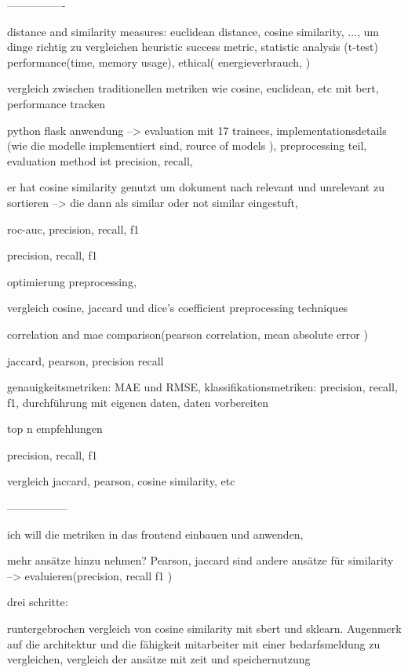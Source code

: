\documentclass[a4paper,12pt]{scrreprt}
\begin{document}
----------------


\cite{andersson2022comparison}
distance and similarity measures: euclidean distance, cosine similarity, ...,
um dinge richtig zu vergleichen heuristic success metric, statistic analysis (t-test) performance(time, memory usage), ethical( energieverbrauch, )

vergleich zwischen traditionellen metriken wie cosine, euclidean, etc mit bert, performance tracken

\cite{navrozidis2020using}

python flask anwendung --> evaluation mit 17 trainees, implementationsdetails (wie die modelle implementiert sind, rource of models ), preprocessing teil, evaluation method ist precision, recall,

er hat cosine similarity genutzt um dokument nach relevant und unrelevant zu sortieren --> die dann als similar oder not similar eingestuft,



\cite{lavi2021consultantbert}
roc-auc, precision, recall, f1

\cite{jamshidian2023evaluation}
precision, recall, f1

optimierung preprocessing,

\cite{henderi2021text}
vergleich cosine, jaccard und dice's coefficient
preprocessing techniques

correlation and mae comparison(pearson correlation, mean absolute error )

\cite{gross2016funktionieren}
jaccard, pearson, precision recall

\cite{ahrendt2016genauigkeit}
genauigkeitsmetriken: MAE und RMSE, klassifikationsmetriken: precision, recall, f1, durchführung mit eigenen daten, daten vorbereiten

\cite{karypis2001evaluation}
top n empfehlungen

\cite{fard2013recommender}
precision, recall, f1

\cite{sondur2016similarity}
vergleich jaccard, pearson, cosine similarity, etc


-----------------

ich will die metriken in das frontend einbauen und anwenden, 

mehr ansätze hinzu nehmen? Pearson, jaccard sind andere ansätze für similarity --> evaluieren(precision, recall f1 )


drei schritte:

runtergebrochen vergleich von cosine similarity mit sbert und sklearn. Augenmerk auf die architektur und die fähigkeit mitarbeiter mit einer bedarfsmeldung zu vergleichen, vergleich der ansätze mit zeit und speichernutzung
\end{document}
